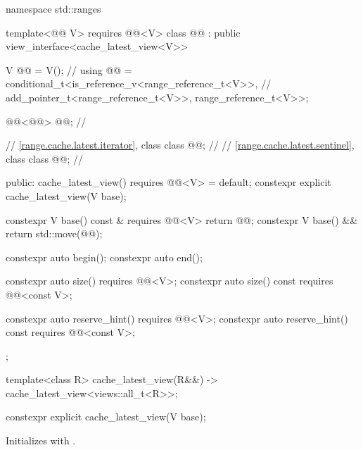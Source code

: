 \begin{codeblock}
namespace std::ranges {
  template<@@ V>
    requires @@<V>
  class @@ : public view_interface<cache_latest_view<V>> {
    V @@ = V();                                                      // \expos
    using @@ = conditional_t<is_reference_v<range_reference_t<V>>, // \expos
                                  add_pointer_t<range_reference_t<V>>,
                                  range_reference_t<V>>;

    @@<@@> @@;                              // \expos

    // \ref{range.cache.latest.iterator}, class 
    class @@;                                                     // \expos
    // \ref{range.cache.latest.sentinel}, class 
    class @@;                                                     // \expos

  public:
    cache_latest_view() requires @@<V> = default;
    constexpr explicit cache_latest_view(V base);

    constexpr V base() const & requires @@<V> { return @@; }
    constexpr V base() && { return std::move(@@); }

    constexpr auto begin();
    constexpr auto end();

    constexpr auto size() requires @@<V>;
    constexpr auto size() const requires @@<const V>;

    constexpr auto reserve_hint() requires @@<V>;
    constexpr auto reserve_hint() const requires @@<const V>;
  };

  template<class R>
    cache_latest_view(R&&) -> cache_latest_view<views::all_t<R>>;
}
\end{codeblock}

%
\begin{itemdecl}
constexpr explicit cache_latest_view(V base);
\end{itemdecl}

\begin{itemdescr}
\pnum
\effects
Initializes  with .
\end{itemdescr}

